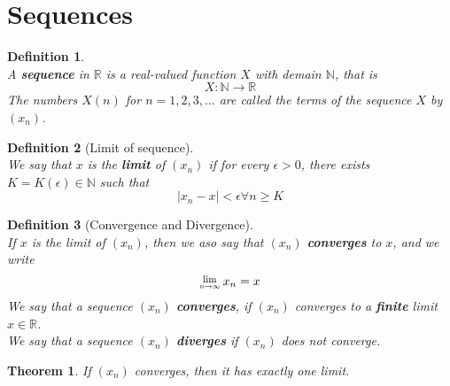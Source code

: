 \documentclass[12pt]{article}
\newcommand{\Lim}[1]{\raisebox{0.5ex}{\scalebox{0.8}{$\displaystyle \lim_{#1}\;$}}}
\newtheorem{definition}{Definition}[section]
\newtheorem{theorem}{Theorem}[section]
\theoremstyle{definition}
\begin{document}
\section{Sequences}
\begin{definition}
\hfill\\\normalfont A \textbf{sequence} in $\mathbb{R}$ is a real-valued function $X$ with demain $\mathbb{N}$, that is
\[
X:\mathbb{N}\to\mathbb{R}
\]
The numbers $X(n)$ for $n=1,2,3,\ldots$ are called the terms of the sequence $X$ by $(x_n)$.
\end{definition}
\begin{definition}[Limit of sequence]
\hfill\\\normalfont We say that $x$ is the \textbf{limit} of $(x_n)$ if for every $\epsilon>0$, there exists $K=K(\epsilon)\in\mathbb{N}$ such that
\[
|x_n-x|<\epsilon\forall n\geq K
\]
\end{definition}
\begin{definition}[Convergence and Divergence]
\hfill\\\normalfont If $x$ is the limit of $(x_n)$, then we aso say that $(x_n)$ \textbf{converges} to $x$, and we write
\[
\Lim{n\to\infty}x_n=x
\] 
We say that a sequence $(x_n)$ \textbf{converges}, if $(x_n)$ converges to a \textbf{finite} limit $x\in\mathbb{R}$.\\
We say that a sequence $(x_n)$ \textbf{diverges} if $(x_n)$ does not converge.
\end{definition}
\begin{theorem}\normalfont If $(x_n)$ converges, then it has exactly one limit.
\end{theorem}
\end{document}
